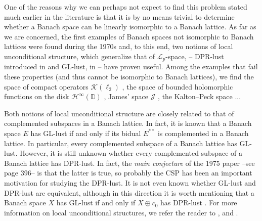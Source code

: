 \documentclass[11pt]{amsart}
\theoremstyle{definition}
\numberwithin{equation}{section}
\begin{document}
One of the reasons why we can perhaps not expect to find this problem stated much earlier in the literature is that it is by no means trivial to determine whether a Banach space can be linearly isomorphic to a Banach lattice. As far as we are concerned, the first examples of Banach spaces not isomorphic to Banach lattices were found during the 1970s and, to this end, two notions of local unconditional structure, which generalize that of $\mathcal{L}_p$-space, -- DPR-lust introduced in \cite{DPR} and GL-lust, in \cite{GL74}-- have proven useful. Among the examples that fail these properties (and thus cannot be isomorphic to Banach lattices), we find the space of compact operators $\mathcal{K}(\ell_2)$ \cite[Theorem 5.1]{GL74}, the space of bounded holomorphic functions on the disk $\mathcal{H}^\infty(\mathbb{D})$ \cite{Pelczynski}, James' space $\mathcal{J}$ \cite[Theorem 8]{Lacey-lust}, the Kalton–Peck space \cite{JLS80}... 

Both notions of local unconditional structure are closely related to that of complemented subspaces in a Banach lattice. In fact, it is known that a Banach space $E$ has GL-lust if and only if its bidual $E^{**}$ is complemented in a Banach lattice. In particular, every complemented subspace of a Banach lattice has GL-lust. However, it is still unknown whether every complemented subspace of a Banach lattice has DPR-lust. In fact, the \textit{main conjecture} of the 1975 paper \cite{FJT75} --see page 396-- is that the latter is true, so probably the CSP has been an important motivation for studying the DPR-lust. It is not even known whether GL-lust and DPR-lust are equivalent, although in this direction it is worth mentioning that a Banach space $X$ has GL-lust if and only if $X\oplus c_0$ has DPR-lust \cite[second Corollary, p. 49]{Lacey-lust}. For more information on local unconditional structures, we refer the reader to \cite[Chapter 17]{DJT}, \cite[Section 34]{TJ-book} and \cite{Lacey-lust}.
\end{document}
